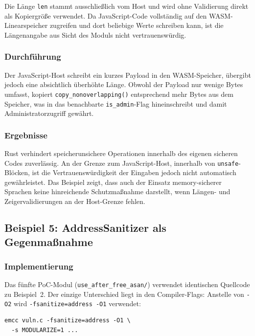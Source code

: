 Die Länge \texttt{len} stammt ausschließlich vom Host und wird ohne Validierung direkt als Kopiergröße verwendet. Da JavaScript-Code vollständig auf den WASM-Linearspeicher zugreifen und dort beliebige Werte schreiben kann, ist die Längenangabe aus Sicht des Moduls nicht vertrauenswürdig.

\subsubsection{Durchführung}

Der JavaScript-Host schreibt ein kurzes Payload in den WASM-Speicher, übergibt jedoch eine absichtlich überhöhte Länge. Obwohl der Payload nur wenige Bytes umfasst, kopiert \texttt{copy\_nonoverlapping()} entsprechend mehr Bytes aus dem Speicher, was in das benachbarte \texttt{is\_admin}-Flag hineinschreibt und damit Administratorzugriff gewährt.

\subsubsection{Ergebnisse}

Rust verhindert speicherunsichere Operationen innerhalb des eigenen sicheren Codes zuverlässig. An der Grenze zum JavaScript-Host, innerhalb von \texttt{unsafe}-Blöcken, ist die Vertrauenswürdigkeit der Eingaben jedoch nicht automatisch gewährleistet. Das Beispiel zeigt, dass auch der Einsatz memory-sicherer Sprachen keine hinreichende Schutzmaßnahme darstellt, wenn Längen- und Zeigervalidierungen an der Host-Grenze fehlen.

\subsection{Beispiel 5: AddressSanitizer als Gegenmaßnahme}

\subsubsection{Implementierung}

Das fünfte PoC-Modul (\texttt{use\_after\_free\_asan/}) verwendet identischen Quellcode zu Beispiel~2. Der einzige Unterschied liegt in den Compiler-Flags: Anstelle von \texttt{-O2} wird \texttt{-fsanitize=address -O1} verwendet:

\begin{verbatim}
emcc vuln.c -fsanitize=address -O1 \
  -s MODULARIZE=1 ...
\end{verbatim}

